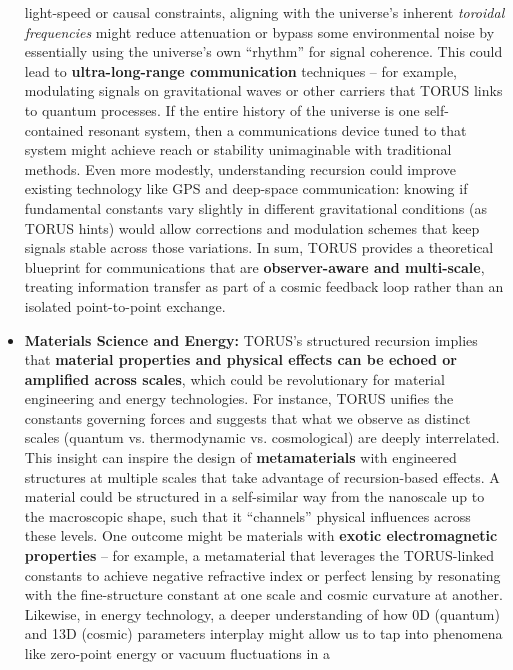 \documentclass[
]{article}
\begin{document}
\begin{itemize}
  light-speed or causal constraints, aligning with the universe's
  inherent \emph{toroidal frequencies} might reduce attenuation or
  bypass some environmental noise by essentially using the universe's
  own ``rhythm'' for signal coherence. This could lead to
  \textbf{ultra-long-range communication} techniques -- for example,
  modulating signals on gravitational waves or other carriers that TORUS
  links to quantum processes. If the entire history of the universe is
  one self-contained resonant system, then a communications device tuned
  to that system might achieve reach or stability unimaginable with
  traditional methods. Even more modestly, understanding recursion could
  improve existing technology like GPS and deep-space communication:
  knowing if fundamental constants vary slightly in different
  gravitational conditions (as TORUS hints\hspace{0pt}) would allow
  corrections and modulation schemes that keep signals stable across
  those variations. In sum, TORUS provides a theoretical blueprint for
  communications that are \textbf{observer-aware and multi-scale},
  treating information transfer as part of a cosmic feedback loop rather
  than an isolated point-to-point exchange.
\item
  \textbf{Materials Science and Energy:} TORUS's structured recursion
  implies that \textbf{material properties and physical effects can be
  echoed or amplified across scales}, which could be revolutionary for
  material engineering and energy technologies. For instance, TORUS
  unifies the constants governing forces and suggests that what we
  observe as distinct scales (quantum vs. thermodynamic vs.
  cosmological) are deeply interrelated\hspace{0pt}. This insight can
  inspire the design of \textbf{metamaterials} with engineered
  structures at multiple scales that take advantage of recursion-based
  effects. A material could be structured in a self-similar way from the
  nanoscale up to the macroscopic shape, such that it ``channels''
  physical influences across these levels. One outcome might be
  materials with \textbf{exotic electromagnetic properties} -- for
  example, a metamaterial that leverages the TORUS-linked constants to
  achieve negative refractive index or perfect lensing by resonating
  with the fine-structure constant at one scale and cosmic curvature at
  another. Likewise, in energy technology, a deeper understanding of how
  0D (quantum) and 13D (cosmic) parameters interplay might allow us to
  tap into phenomena like zero-point energy or vacuum fluctuations in a

\end{itemize}
\end{document}
